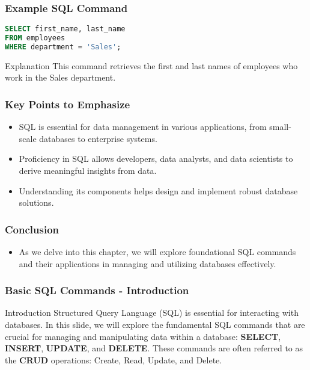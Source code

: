 \documentclass[aspectratio=169]{beamer}
\begin{document}
\begin{frame}[fragile]
    \frametitle{Example SQL Command}
    \begin{lstlisting}[language=SQL]
SELECT first_name, last_name 
FROM employees 
WHERE department = 'Sales';
    \end{lstlisting}
    \begin{block}{Explanation}
        This command retrieves the first and last names of employees who work in the Sales department.
    \end{block}
\end{frame}

\begin{frame}[fragile]
    \frametitle{Key Points to Emphasize}
    \begin{itemize}
        \item SQL is essential for data management in various applications, from small-scale databases to enterprise systems.
        \item Proficiency in SQL allows developers, data analysts, and data scientists to derive meaningful insights from data.
        \item Understanding its components helps design and implement robust database solutions.
    \end{itemize}
\end{frame}

\begin{frame}[fragile]
    \frametitle{Conclusion}
    \begin{itemize}
        \item As we delve into this chapter, we will explore foundational SQL commands and their applications in managing and utilizing databases effectively.
    \end{itemize}
\end{frame}

\begin{frame}[fragile]
    \frametitle{Basic SQL Commands - Introduction}
    \begin{block}{Introduction}
        Structured Query Language (SQL) is essential for interacting with databases. In this slide, we will explore the fundamental SQL commands that are crucial for managing and manipulating data within a database: 
        \textbf{SELECT}, \textbf{INSERT}, \textbf{UPDATE}, and \textbf{DELETE}. 
        These commands are often referred to as the \textbf{CRUD} operations: Create, Read, Update, and Delete.
    \end{block}
\end{frame}
\end{document}
